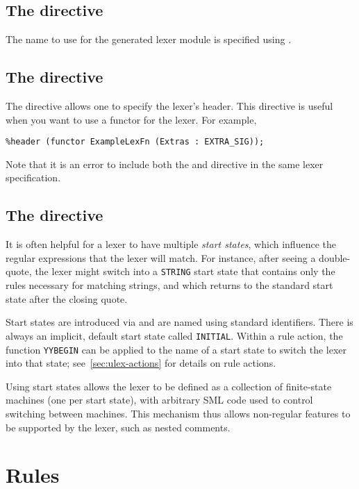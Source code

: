 \subsection{The  directive}

The name to use for the generated lexer module is specified using .

\subsection{The  directive}
The  directive allows one to specify the lexer's header.
This directive is useful when you want to use a functor for the lexer.
For example,
\begin{lstlisting}
%header (functor ExampleLexFn (Extras : EXTRA_SIG));
\end{lstlisting}%
Note that it is an error to include both the  and  directive in the
same lexer specification.

\subsection{The  directive}
\label{sec:start-states}

It is often helpful for a lexer to have multiple \emph{start states}, which influence
the regular expressions that the lexer will match. 
For instance, after seeing a double-quote, the lexer might switch into a \texttt{STRING}
start state that contains only the rules necessary for matching strings, and which
returns to the standard start state after the closing quote.

Start states are introduced via  and are named using standard identifiers. 
There is always an implicit, default start state called \texttt{INITIAL}.
Within a rule action, the function \texttt{YYBEGIN} can be applied to the name
of a start state to switch the lexer into that state; see~\ref{sec:ulex-actions}
for details on rule actions.

Using start states allows the lexer to be defined as a collection of finite-state machines
(one per start state), with arbitrary SML code used to control switching between machines.
This mechanism thus allows non-regular features to be supported by the lexer, such as
nested comments.

\section{Rules}\label{sec:ulex-rules}

